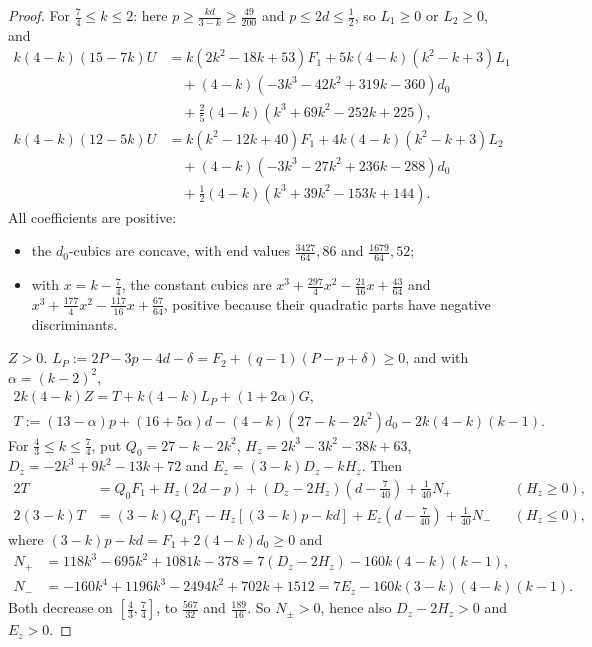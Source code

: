 \documentclass[11pt,a4paper]{article}
\numberwithin{equation}{section}
\theoremstyle{definition}
\begin{document}
\begin{proof}
For $\frac74\le k\le2$: here $p\ge\frac{kd}{3-k}\ge\frac{49}{200}$ and
$p\le2d\le\frac12$, so $L_1\ge0$ or $L_2\ge0$, and
\begin{align*}
k(4-k)(15-7k)U&=k(2k^2-18k+53)F_1+5k(4-k)(k^2-k+3)L_1\\
&\quad+(4-k)(-3k^3-42k^2+319k-360)d_0\\
&\quad+\tfrac25(4-k)(k^3+69k^2-252k+225),\\
k(4-k)(12-5k)U&=k(k^2-12k+40)F_1+4k(4-k)(k^2-k+3)L_2\\
&\quad+(4-k)(-3k^3-27k^2+236k-288)d_0\\
&\quad+\tfrac12(4-k)(k^3+39k^2-153k+144).
\end{align*}
All coefficients are positive:
\begin{itemize}
\item the $d_0$-cubics are concave, with end values $\frac{3427}{64},86$ and
$\frac{1679}{64},52$;
\item with $x=k-\frac74$, the constant cubics are
$x^3+\frac{297}4x^2-\frac{21}{16}x+\frac{43}{64}$ and
$x^3+\frac{177}4x^2-\frac{117}{16}x+\frac{67}{64}$, positive because their
quadratic parts have negative discriminants.
\end{itemize}

\emph{$Z>0$.} $L_P:=2P-3p-4d-\delta=F_2+(q-1)(P-p+\delta)\ge0$, and with
$\alpha=(k-2)^2$,
\begin{gather*}
2k(4-k)Z=T+k(4-k)L_P+(1+2\alpha)G,\\
T:=(13-\alpha)p+(16+5\alpha)d-(4-k)(27-k-2k^2)d_0-2k(4-k)(k-1).
\end{gather*}
For $\frac43\le k\le\frac74$, put $Q_0=27-k-2k^2$,
$H_z=2k^3-3k^2-38k+63$, $D_z=-2k^3+9k^2-13k+72$ and $E_z=(3-k)D_z-kH_z$. Then
\begin{align*}
2T&=Q_0F_1+H_z(2d-p)+(D_z-2H_z)(d-\tfrac7{40})+\tfrac1{40}N_+&&(H_z\ge0),\\
2(3-k)T&=(3-k)Q_0F_1-H_z[(3-k)p-kd]+E_z(d-\tfrac7{40})+\tfrac1{40}N_-&&(H_z\le0),
\end{align*}
where $(3-k)p-kd=F_1+2(4-k)d_0\ge0$ and
\begin{align*}
N_+&=118k^3-695k^2+1081k-378=7(D_z-2H_z)-160k(4-k)(k-1),\\
N_-&=-160k^4+1196k^3-2494k^2+702k+1512=7E_z-160k(3-k)(4-k)(k-1).
\end{align*}
Both decrease on $[\frac43,\frac74]$, to $\frac{567}{32}$ and $\frac{189}{16}$.
So $N_\pm>0$, hence also $D_z-2H_z>0$ and $E_z>0$.


\end{proof}
\end{document}
